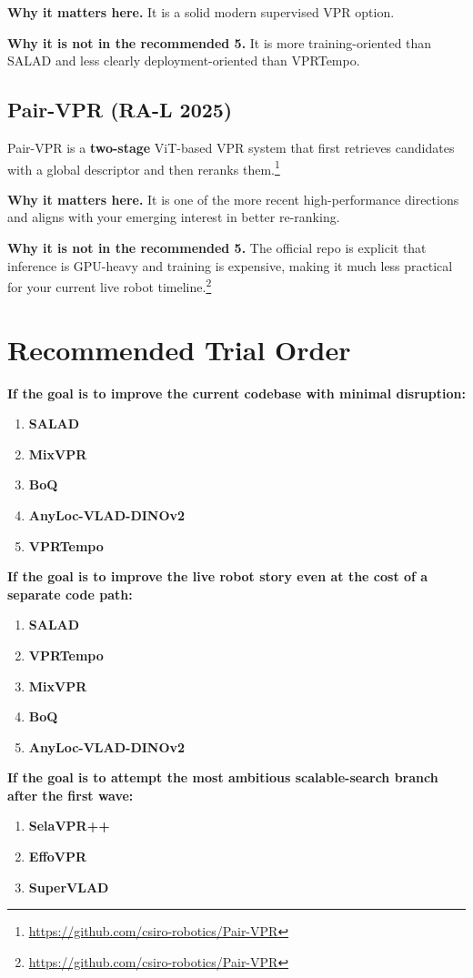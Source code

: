 \documentclass[11pt]{article}
\begin{document}
\textbf{Why it matters here.} It is a solid modern supervised VPR option.

\textbf{Why it is not in the recommended 5.} It is more training-oriented than SALAD and less clearly deployment-oriented than VPRTempo.

\subsection*{Pair-VPR (RA-L 2025)}
Pair-VPR is a \textbf{two-stage} ViT-based VPR system that first retrieves candidates with a global descriptor and then reranks them.\footnote{\url{https://github.com/csiro-robotics/Pair-VPR}}

\textbf{Why it matters here.} It is one of the more recent high-performance directions and aligns with your emerging interest in better re-ranking.

\textbf{Why it is not in the recommended 5.} The official repo is explicit that inference is GPU-heavy and training is expensive, making it much less practical for your current live robot timeline.\footnote{\url{https://github.com/csiro-robotics/Pair-VPR}}

\section*{Recommended Trial Order}
\textbf{If the goal is to improve the current codebase with minimal disruption:}
\begin{enumerate}[leftmargin=*]
  \item \textbf{SALAD}
  \item \textbf{MixVPR}
  \item \textbf{BoQ}
  \item \textbf{AnyLoc-VLAD-DINOv2}
  \item \textbf{VPRTempo}
\end{enumerate}

\textbf{If the goal is to improve the live robot story even at the cost of a separate code path:}
\begin{enumerate}[leftmargin=*]
  \item \textbf{SALAD}
  \item \textbf{VPRTempo}
  \item \textbf{MixVPR}
  \item \textbf{BoQ}
  \item \textbf{AnyLoc-VLAD-DINOv2}
\end{enumerate}

\textbf{If the goal is to attempt the most ambitious scalable-search branch after the first wave:}
\begin{enumerate}[leftmargin=*]
  \item \textbf{SelaVPR++}
  \item \textbf{EffoVPR}
  \item \textbf{SuperVLAD}
\end{enumerate}
\end{document}
